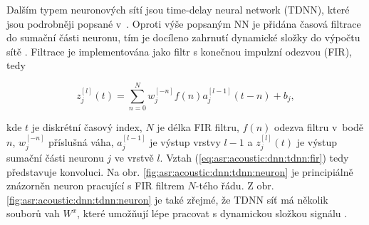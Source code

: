 Dalším typem neuronových sítí jsou time-delay neural network (TDNN), které jsou podrobněji popsané v~\cite{Waibel1989}. Oproti výše popsaným NN je přidána časová filtrace do sumační části neuronu, tím je docíleno zahrnutí dynamické složky do výpočtu sítě \cite{Craig2000}. Filtrace je implementována jako filtr s konečnou impulzní odezvou (FIR), tedy

\begin{equation}
  z_{j}^{[l]}\left(t\right) = \sum_{n=0}^{N} w_{j}^{[-n]}f\left(n\right)a^{[l-1]}_{j}\left(t - n\right) + b_{j},
  \label{eq:asr:acoustic:dnn:tdnn:fir}
\end{equation}

\noindent kde $t$ je diskrétní časový index, $N$ je délka FIR filtru, $f\left(n\right)$ odezva filtru v~bodě $n$, $w_{j}^{[-n]}$ příslušná váha, $a^{[l-1]}_{j}$ je výstup vrstvy $l-1$ a $z_{j}^{[l]}\left(t\right)$ je výstup sumační části neuronu $j$ ve vrstvě $l$. Vztah (\ref{eq:asr:acoustic:dnn:tdnn:fir}) tedy představuje konvoluci. Na obr. \ref{fig:asr:acoustic:dnn:tdnn:neuron} je principiálně znázorněn neuron pracující s FIR filtrem $N$-tého řádu. Z obr. \ref{fig:asr:acoustic:dnn:tdnn:neuron} je také zřejmé, že TDNN síť má několik souborů vah $W^{x}$, které umožňují lépe pracovat s dynamickou složkou signálu \cite{Peddinti2015}.


